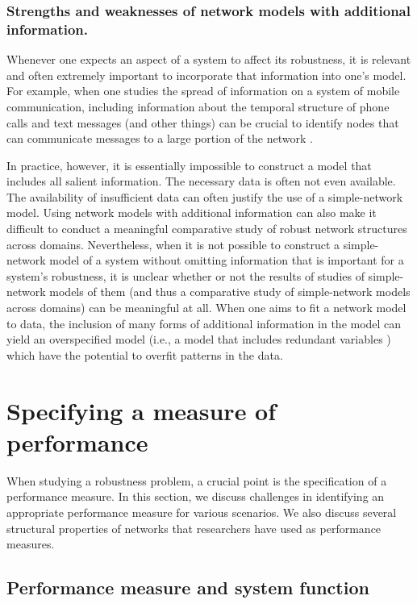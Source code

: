 \documentclass{comnet-mod}
\begin{document}
\subsubsection{Strengths and weaknesses of network models with additional information.}

Whenever one expects an aspect of a system to affect its robustness, it is relevant and often extremely important to incorporate that information into one's model. For example, when one studies the spread of information on a system of mobile communication, including information about the temporal structure of phone calls and text messages (and other things) can be crucial to identify nodes that can communicate messages to a large portion of the network \cite{Scellato2011}. 

In practice, however, it is essentially impossible to construct a model that includes all salient information. The necessary data is often not even available. The availability of insufficient data can often justify the use of a simple-network model. Using network models with additional information can also make it difficult to conduct a meaningful comparative study of robust network structures across domains. Nevertheless, when it is not possible to construct a simple-network model of a system without omitting information that is important for a system's robustness, it is unclear whether or not the results of studies of simple-network models of them (and thus a comparative study of simple-network models across domains) can be meaningful at all. When one aims to fit a network model to data, the inclusion of many forms of additional information in the model can yield an overspecified model (i.e., a model that includes redundant variables \cite{Mohr2021}) which have the potential to overfit patterns in the data. 


\section{Specifying a measure of performance}\label{sec:performance_measures}

When studying a robustness problem, a crucial point is the specification of a performance measure. In this section, we discuss challenges in identifying an appropriate performance measure for various scenarios. We also discuss several structural properties of networks that researchers have used as performance measures.


\subsection{Performance measure and system function}
\end{document}
